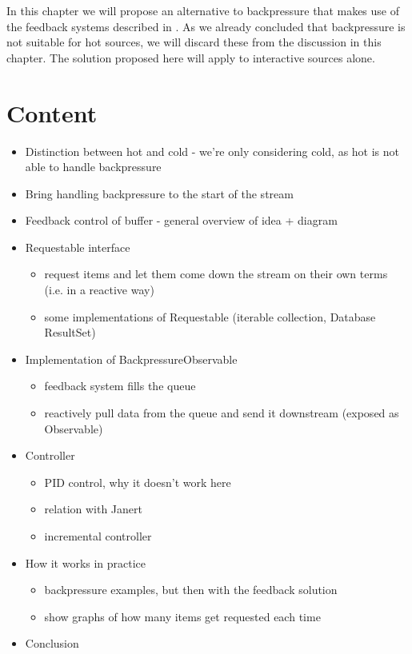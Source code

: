 In this chapter we will propose an alternative to backpressure that makes use of the feedback systems described in . As we already concluded that backpressure is not suitable for hot sources, we will discard these from the discussion in this chapter. The solution proposed here will apply to interactive sources alone.

\clearpage
\section*{Content}
\begin{itemize}
	\item Distinction between hot and cold - we're only considering cold, as hot is not able to handle backpressure
	\item Bring handling backpressure to the start of the stream
	\item Feedback control of buffer - general overview of idea + diagram
	\item Requestable interface
		\begin{itemize}
			\item request items and let them come down the stream on their own terms (i.e. in a reactive way)
			\item some implementations of Requestable (iterable collection, Database ResultSet)
		\end{itemize}
	\item Implementation of BackpressureObservable
		\begin{itemize}
			\item feedback system fills the queue
			\item reactively pull data from the queue and send it downstream (exposed as Observable)
		\end{itemize}
	\item Controller
		\begin{itemize}
			\item PID control, why it doesn't work here
			\item relation with Janert
			\item incremental controller
		\end{itemize}
	\item How it works in practice
		\begin{itemize}
			\item backpressure examples, but then with the feedback solution
			\item show graphs of how many items get requested each time
		\end{itemize}
	\item Conclusion
\end{itemize}